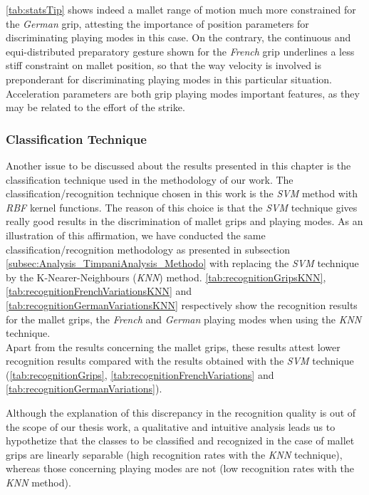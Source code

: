 \mytabname \ref{tab:statsTip} shows indeed a mallet range of motion much more constrained for the \emph{German} grip, attesting the importance of position parameters for discriminating playing modes in this case. On the contrary, the continuous and equi-distributed preparatory gesture shown for the \emph{French} grip underlines a less stiff constraint on mallet position, so that the way velocity is involved is preponderant for discriminating playing modes in this particular situation. Acceleration parameters are both grip playing modes important features, as they may be related to the effort of the strike.


			\subsubsection{Classification Technique}
			\label{subsubsec:Analysis_Discussion_Classification}

Another issue to be discussed about the results presented in this chapter is the classification technique used in the methodology of our work. The classification/recognition technique chosen in this work is the \emph{SVM} method with \emph{RBF} kernel functions. The reason of this choice is that the \emph{SVM} technique gives really good results in the discrimination of mallet grips and playing modes. As an illustration of this affirmation, we have conducted the same classification/recognition methodology as presented in subsection \ref{subsec:Analysis_TimpaniAnalysis_Methodo} with replacing the \emph{SVM} technique by the K-Nearer-Neighbours (\emph{KNN}) method. \mytabname \ref{tab:recognitionGripsKNN}, \ref{tab:recognitionFrenchVariationsKNN} and \ref{tab:recognitionGermanVariationsKNN} respectively show the recognition results for the mallet grips, the \emph{French} and \emph{German} playing modes when using the \emph{KNN} technique.\\

Apart from the results concerning the mallet grips, these results attest lower recognition results compared with the results obtained with the \emph{SVM} technique (\mytabname \ref{tab:recognitionGrips}, \ref{tab:recognitionFrenchVariations} and \ref{tab:recognitionGermanVariations}).

Although the explanation of this discrepancy in the recognition quality is out of the scope of our thesis work, a qualitative and intuitive analysis leads us to hypothetize that the classes to be classified and recognized in the case of mallet grips are linearly separable (high recognition rates with the \emph{KNN} technique), whereas those concerning playing modes are not (low recognition rates with the \emph{KNN} method).\\

